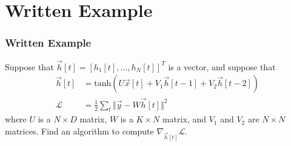 \documentclass{beamer}
\begin{document}
\section[Example]{Written Example}
\setcounter{subsection}{1}

\begin{frame}
  \frametitle{Written Example}
  Suppose that $\vec{h}[t]=[h_1[t],\ldots,h_N[t]]^T$ is a vector, and suppose that
  \begin{align*}
    \vec{h}[t] &= \mbox{tanh}\left(U\vec{x}[t] + V_1\vec{h}[t-1]+V_2\vec{h}[t-2]\right)\\
        {\mathcal L} &= \frac{1}{2}\sum_t \Vert\vec{y}-W\vec{h}[t]\Vert^2
  \end{align*}
  where $U$ is a $N\times D$ matrix, $W$ is a $K\times N$ matrix, and
  $V_1$ and $V_2$ are $N\times N$ matrices.  Find an algorithm to
  compute $\nabla_{\vec{h}[t]}{\mathcal L}$.
\end{frame}
\end{document}
